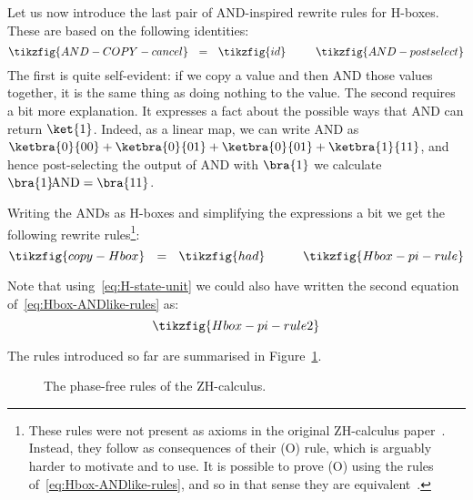 \documentclass[a4paper,onecolumn,superscriptaddress,11pt,%
				unpublished,%
				allowfontchageintitle,%
				]{quantumarticle}
\begin{document}
Let us now introduce the last pair of AND-inspired rewrite rules for H-boxes. These are based on the following identities:
\begin{equation}
	\tikzfig{AND-COPY-cancel} \ \ = \ \ \tikzfig{id} \qquad \ \  \tikzfig{AND-postselect}
\end{equation}
The first is quite self-evident: if we copy a value and then AND those values together, it is the same thing as doing nothing to the value. 
The second requires a bit more explanation. It expresses a fact about the possible ways that AND can return $\ket{1}$. Indeed, as a linear map, we can write AND as $\ketbra{0}{00}+\ketbra{0}{01}+\ketbra{0}{01}+\ketbra{1}{11}$, and hence post-selecting the output of AND with $\bra{1}$ we calculate $\bra{1}\!\text{AND} = \bra{11}$.

Writing the ANDs as H-boxes and simplifying the expressions a bit we get the following rewrite rules\footnote{These rules were not present as axioms in the original ZH-calculus paper~\cite{backens2018zhcalculus}. Instead, they follow as consequences of their (O) rule, which is arguably harder to motivate and to use. It is possible to prove (O) using the rules of~\eqref{eq:Hbox-ANDlike-rules}, and so in that sense they are equivalent~\cite{zhcompleteness2020}.}:
\begin{equation}\label{eq:Hbox-ANDlike-rules}
	\tikzfig{copy-Hbox} \ \ = \ \ \tikzfig{had} \qquad \quad \tikzfig{Hbox-pi-rule}
\end{equation}

Note that using~\eqref{eq:H-state-unit} we could also have written the second equation of~\eqref{eq:Hbox-ANDlike-rules} as:
\begin{equation}
	\tikzfig{Hbox-pi-rule2}
\end{equation}

The rules introduced so far are summarised in Figure~\ref{fig:zh-rules}.

\begin{figure}%
\centering
{}
\caption{
	The phase-free rules of the ZH-calculus.
}
\label{fig:zh-rules}
\end{figure}
\end{document}
